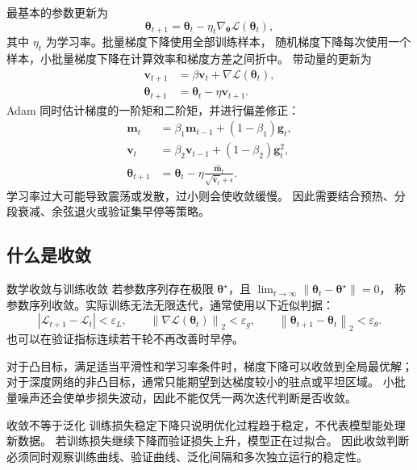 \documentclass[UTF8,zihao=-4,a4paper,fontset=windows]{ctexart}
\newcommand{\norm}[1]{\left\lVert #1\right\rVert}
\newcommand{\abs}[1]{\left|#1\right|}
\newcommand{\loss}{\mathcal{L}}
\begin{document}
最基本的参数更新为
\begin{equation}
  \bm{\theta}_{t+1}
  =\bm{\theta}_{t}-\eta_t\nabla_{\bm{\theta}}\loss(\bm{\theta}_t),
  \label{eq:gd}
\end{equation}
其中 $\eta_t$ 为学习率。批量梯度下降使用全部训练样本，
随机梯度下降每次使用一个样本，小批量梯度下降在计算效率和梯度方差之间折中。
带动量的更新为
\begin{align}
  \bm{v}_{t+1}&=\beta\bm{v}_t+\nabla\loss(\bm{\theta}_t),\\
  \bm{\theta}_{t+1}&=\bm{\theta}_t-\eta\bm{v}_{t+1}.
\end{align}
Adam 同时估计梯度的一阶矩和二阶矩，并进行偏差修正\cite{kingma}：
\begin{align}
  \bm{m}_t&=\beta_1\bm{m}_{t-1}+(1-\beta_1)\bm{g}_t,\\
  \bm{v}_t&=\beta_2\bm{v}_{t-1}+(1-\beta_2)\bm{g}_t^2,\\
  \bm{\theta}_{t+1}
  &=\bm{\theta}_t-\eta
  \frac{\hat{\bm{m}}_t}{\sqrt{\hat{\bm{v}}_t}+\epsilon}.
\end{align}
学习率过大可能导致震荡或发散，过小则会使收敛缓慢。
因此需要结合预热、分段衰减、余弦退火或验证集早停等策略。

\subsection{什么是收敛}

\begin{definitionbox}{数学收敛与训练收敛}
若参数序列存在极限 $\bm{\theta}^{\star}$，且
$\lim_{t\to\infty}\norm{\bm{\theta}_t-\bm{\theta}^{\star}}=0$，
称参数序列收敛。实际训练无法无限迭代，通常使用以下近似判据：
\[
  \abs{\loss_{t+1}-\loss_t}<\varepsilon_L,\qquad
  \norm{\nabla\loss(\bm{\theta}_t)}_2<\varepsilon_g,\qquad
  \norm{\bm{\theta}_{t+1}-\bm{\theta}_t}_2<\varepsilon_\theta .
\]
也可以在验证指标连续若干轮不再改善时早停。
\end{definitionbox}

对于凸目标，满足适当平滑性和学习率条件时，梯度下降可以收敛到全局最优解；
对于深度网络的非凸目标，通常只能期望到达梯度较小的驻点或平坦区域。
小批量噪声还会使单步损失波动，因此不能仅凭一两次迭代判断是否收敛。

\begin{notebox}{收敛不等于泛化}
训练损失稳定下降只说明优化过程趋于稳定，不代表模型能处理新数据。
若训练损失继续下降而验证损失上升，模型正在过拟合。
因此收敛判断必须同时观察训练曲线、验证曲线、泛化间隔和多次独立运行的稳定性。
\end{notebox}
\end{document}
